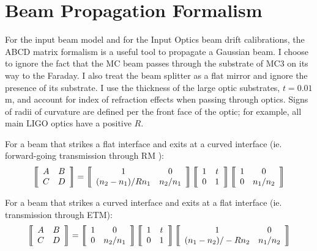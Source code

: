 \section{Beam Propagation Formalism}
\label{sec:driftcal}
For the input beam model and for the Input Optics beam drift
calibrations, the ABCD matrix formalism is a useful tool to propagate
a Gaussian beam. I choose to ignore the fact that the MC beam passes
through the substrate of MC3 on its way to the Faraday. I also treat
the beam splitter as a flat mirror and ignore the presence of its
substrate. I use the thickness of the large optic substrates, $t=0.01$
m, and account for index of refraction effects when passing through
optics. Signs of radii of curvature are defined per the front face of
the optic; for example, all main LIGO optics have a positive $R$.

For a beam that strikes a flat interface and exits at a curved
interface (ie. forward-going transmission through RM ):
\begin{equation}
\left\llbracket \begin{array}{c c}
A & B \\
C & D \end{array} \right\rrbracket = 
\left\llbracket \begin{array}{c c}
1 & 0 \\
(n_2-n_1)/Rn_1 & n_2/n_1 \end{array} \right\rrbracket
\left\llbracket \begin{array}{c c}
1 & t \\
0 & 1 \end{array} \right\rrbracket
\left\llbracket \begin{array}{c c}
1 & 0 \\
0 & n_1/n_2 \end{array} \right\rrbracket
\end{equation}

For a beam that strikes a curved interface and exits at a flat
interface (ie. transmission through ETM):
\begin{equation}
\left\llbracket \begin{array}{c c}
A & B \\
C & D \end{array} \right\rrbracket = 
\left\llbracket \begin{array}{c c}
1 & 0 \\
0 & n_2/n_1 \end{array} \right\rrbracket
\left\llbracket \begin{array}{c c}
1 & t \\
0 & 1 \end{array} \right\rrbracket
\left\llbracket \begin{array}{c c}
1 & 0 \\
(n_1-n_2)/-Rn_2 & n_1/n_2 \end{array} \right\rrbracket
\end{equation}

